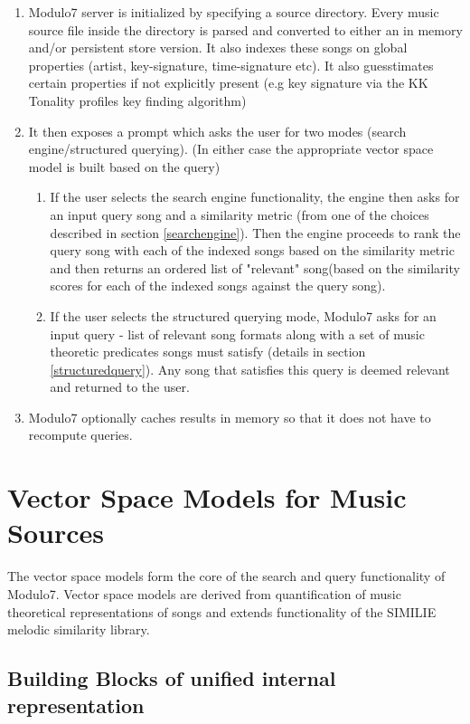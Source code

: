 \documentclass{article}
\begin{document}
\begin{enumerate}
\item Modulo7 server is initialized by specifying a source directory. Every music source file inside the directory is parsed and converted to either an in memory and/or persistent store version. It also indexes these songs on global properties (artist, key-signature, time-signature etc). It also guesstimates certain properties if not explicitly present (e.g key signature via the KK Tonality profiles key finding \cite{kkTonalityKeyFinding} algorithm)
\item It then exposes a prompt which asks the user for two modes (search engine/structured querying). (In either case the appropriate vector space model is built based on the query)
\begin{enumerate}
\item If the user selects the search engine functionality, the engine then asks for an input query song and a similarity metric (from one of the choices described in section \ref{searchengine}). Then the engine proceeds to rank the query song with each of the indexed songs based on the similarity metric and then returns an ordered list of "relevant" song(based on the similarity scores for each of the indexed songs against the query song). 
\item If the user selects the structured querying mode, Modulo7 asks for an input query - list of relevant song formats along with a set of music theoretic predicates songs must satisfy (details in section \ref{structuredquery}). Any song that satisfies this query is deemed relevant and returned to the user.  
\end{enumerate}
\item Modulo7 optionally caches results in memory so that it does not have to recompute queries.

\end{enumerate}

\section{Vector Space Models for Music Sources} \label{vecmodels}

The vector space models form the core of the search and query functionality of Modulo7. Vector space models are derived from quantification of music theoretical representations of songs and extends functionality of the SIMILIE \cite{similie} melodic similarity library.

\subsection{Building Blocks of unified internal representation}
\end{document}
